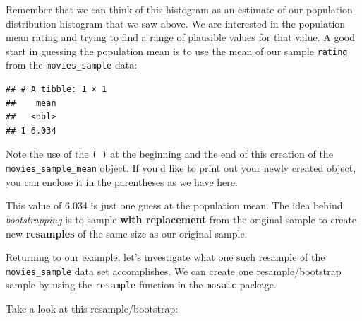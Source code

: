 \documentclass[]{tufte-book}
\newenvironment{Shaded}{\begin{snugshade}}{\end{snugshade}}
\newcommand{\KeywordTok}[1]{\textcolor[rgb]{0.13,0.29,0.53}{\textbf{{#1}}}}
\newcommand{\DataTypeTok}[1]{\textcolor[rgb]{0.13,0.29,0.53}{{#1}}}
\newcommand{\StringTok}[1]{\textcolor[rgb]{0.31,0.60,0.02}{{#1}}}
\newcommand{\OtherTok}[1]{\textcolor[rgb]{0.56,0.35,0.01}{{#1}}}
\newcommand{\NormalTok}[1]{{#1}}
\begin{document}
Remember that we can think of this histogram as an estimate of our
population distribution histogram that we saw above. We are interested
in the population mean rating and trying to find a range of plausible
values for that value. A good start in guessing the population mean is
to use the mean of our sample \texttt{rating} from the
\texttt{movies\_sample} data:

\begin{Shaded}
\end{Shaded}

\begin{verbatim}
## # A tibble: 1 × 1
##    mean
##   <dbl>
## 1 6.034
\end{verbatim}

Note the use of the \texttt{(\ )} at the beginning and the end of this
creation of the \texttt{movies\_sample\_mean} object. If you'd like to
print out your newly created object, you can enclose it in the
parentheses as we have here.

This value of 6.034 is just one guess at the population mean. The idea
behind \emph{bootstrapping} is to sample \textbf{with replacement} from
the original sample to create new \textbf{resamples} of the same size as
our original sample.

Returning to our example, let's investigate what one such resample of
the \texttt{movies\_sample} data set accomplishes. We can create one
resample/bootstrap sample by using the \texttt{resample} function in the
\texttt{mosaic} package.

\begin{Shaded}
\end{Shaded}

Take a look at this resample/bootstrap:
\end{document}
